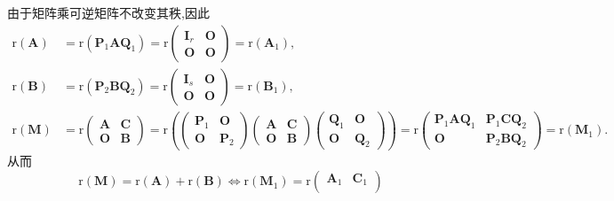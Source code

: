 \documentclass[lang=cn,newtx,10pt,scheme=chinese]{elegantbook}
\begin{document}
\begin{note}
        由于矩阵乘可逆矩阵不改变其秩,因此
        \begin{align*}
        \mathrm{r}(\boldsymbol{A})&=\mathrm{r}(\boldsymbol{P}_1\boldsymbol{AQ}_1)=\mathrm{r}\begin{pmatrix}
        \boldsymbol{I}_r & \boldsymbol{O} \\
        \boldsymbol{O} & \boldsymbol{O}
        \end{pmatrix}=\mathrm{r}(\boldsymbol{A}_1),\\
        \mathrm{r}(\boldsymbol{B})&=\mathrm{r}(\boldsymbol{P}_2\boldsymbol{BQ}_2)=\mathrm{r}\begin{pmatrix}
        \boldsymbol{I}_s & \boldsymbol{O} \\
        \boldsymbol{O} & \boldsymbol{O}
        \end{pmatrix}=\mathrm{r}(\boldsymbol{B}_1),\\
        \mathrm{r}(\boldsymbol{M})&=\mathrm{r}\begin{pmatrix}
        \boldsymbol{A} & \boldsymbol{C} \\
        \boldsymbol{O} & \boldsymbol{B}
        \end{pmatrix}=\mathrm{r}\left(\begin{pmatrix}
        \boldsymbol{P}_1 & \boldsymbol{O} \\
        \boldsymbol{O} & \boldsymbol{P}_2
        \end{pmatrix}\begin{pmatrix}
        \boldsymbol{A} & \boldsymbol{C} \\
        \boldsymbol{O} & \boldsymbol{B}
        \end{pmatrix}\begin{pmatrix}
        \boldsymbol{Q}_1 & \boldsymbol{O} \\
        \boldsymbol{O} & \boldsymbol{Q}_2
        \end{pmatrix}\right)
        =\mathrm{r}\begin{pmatrix}
        \boldsymbol{P}_1\boldsymbol{AQ}_1 & \boldsymbol{P}_1\boldsymbol{CQ}_2 \\
        \boldsymbol{O} & \boldsymbol{P}_2\boldsymbol{BQ}_2
        \end{pmatrix}=\mathrm{r}(\boldsymbol{M}_1).
        \end{align*}
        从而
        \[
        \mathrm{r}(\boldsymbol{M})=\mathrm{r}(\boldsymbol{A})+\mathrm{r}(\boldsymbol{B})\Leftrightarrow\mathrm{r}(\boldsymbol{M}_1)=\mathrm{r}\begin{pmatrix}
        \boldsymbol{A}_1 & \boldsymbol{C}_1 \\

\end{pmatrix}\]
\end{note}
\end{document}
